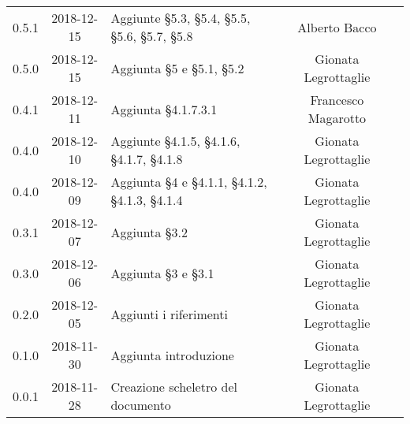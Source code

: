 {\begin{longtable}{ c c C{4cm} c c }
		0.5.1 & 2018-12-15 & Aggiunte §5.3, §5.4, §5.5, §5.6, §5.7, §5.8 & Alberto Bacco & \reda{} \\
		
		0.5.0 & 2018-12-15 & Aggiunta §5 e §5.1, §5.2 & Gionata Legrottaglie & \reda{} \\
		
		0.4.1 & 2018-12-11 & Aggiunta §4.1.7.3.1 & Francesco Magarotto & \reda{} \\ 
		
		0.4.0 & 2018-12-10 & Aggiunte §4.1.5, §4.1.6, §4.1.7, §4.1.8 & Gionata Legrottaglie & \reda{} \\ 
		0.4.0 & 2018-12-09 & Aggiunta §4 e §4.1.1, §4.1.2, §4.1.3, §4.1.4 & Gionata Legrottaglie & \reda{} \\ 
		
		0.3.1 & 2018-12-07 & Aggiunta §3.2 & Gionata Legrottaglie & \reda{} \\ 
		
		0.3.0 & 2018-12-06 & Aggiunta §3 e §3.1 & Gionata Legrottaglie & \reda{} \\ 
		
		0.2.0 & 2018-12-05 & Aggiunti i riferimenti & Gionata Legrottaglie & \reda{} \\ 
		
		0.1.0 & 2018-11-30 & Aggiunta introduzione & Gionata Legrottaglie & \reda{} \\
		
		0.0.1 & 2018-11-28 & Creazione scheletro del documento & Gionata Legrottaglie & \reda{}\\
		
	\end{longtable}

}